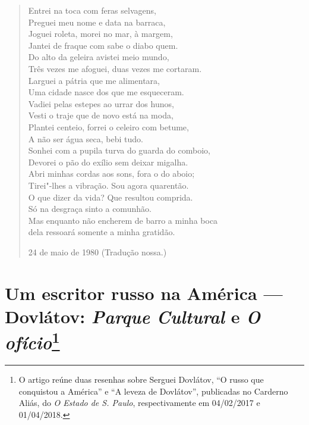 \begin{verse}
Entrei na toca com feras selvagens, \\
Preguei meu nome e data na barraca, \\
Joguei roleta, morei no mar, à margem, \\
Jantei de fraque com sabe o diabo quem. \\[8pt]
Do alto da geleira avistei meio mundo, \\
Três vezes me afoguei, duas vezes me \qb{}cortaram. \\
Larguei a pátria que me alimentara, \\
Uma cidade nasce dos que me esqueceram. \\[8pt]
Vadiei pelas estepes ao urrar dos hunos, \\
Vesti o traje que de novo está na moda, \\
Plantei centeio, forrei o celeiro com betume, \\
A não ser água seca, bebi tudo. \\[8pt]
Sonhei com a pupila turva do guarda do \qb{}comboio, \\
Devorei o pão do exílio sem deixar migalha. \\
Abri minhas cordas aos sons, fora o do aboio; \\
Tirei"-lhes a vibração. Sou agora quarentão. \\[8pt]
O que dizer da vida? Que resultou comprida. \\
Só na desgraça sinto a comunhão. \\
Mas enquanto não encherem de barro a \qb{}minha boca \\
dela ressoará somente a minha gratidão.

24 de maio de 1980 (Tradução nossa.)

\end{verse}


\chapter*{Um escritor russo na América --- Dovlátov: \emph{Parque Cultural} e \emph{O ofício}\footnote{O artigo reúne duas resenhas sobre Serguei Dovlátov, ``O russo que conquistou a América'' e ``A leveza de Dovlátov'', publicadas no Carderno Aliás, do \emph{O Estado de S. Paulo}, respectivamente em 04/02/2017 e 01/04/2018.}}

\label{dovlatov}

